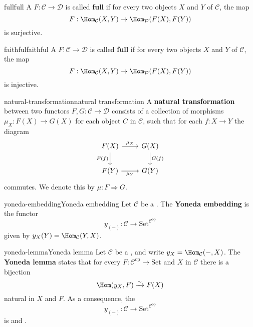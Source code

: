 \begin{topic}{full}{full}
    A  $F : \mathcal{C} \to \mathcal{D}$ is called \textbf{full} if for every two objects $X$ and $Y$ of $\mathcal{C}$, the map
    \[ F : \Hom_{\mathcal{C}}(X, Y) \to \Hom_{\mathcal{D}}(F(X), F(Y)) \]
    is surjective.
\end{topic}

\begin{topic}{faithful}{faithful}
    A  $F : \mathcal{C} \to \mathcal{D}$ is called \textbf{full} if for every two objects $X$ and $Y$ of $\mathcal{C}$, the map
    \[ F : \Hom_{\mathcal{C}}(X, Y) \to \Hom_{\mathcal{D}}(F(X), F(Y)) \]
    is injective.
\end{topic}

\begin{topic}{natural-transformation}{natural transformation}
    A \textbf{natural transformation} between two functors $F, G : \mathcal{C} \to \mathcal{D}$ consists of a collection of morphisms $\mu_X : F(X) \to G(X)$ for each object $C$ in $\mathcal{C}$, such that for each $f : X \to Y$ the diagram
    \[ \begin{tikzcd} F(X) \arrow{r}{\mu_X} \arrow[swap]{d}{F(f)} & G(X) \arrow{d}{G(f)} \\ F(Y) \arrow[swap]{r}{\mu_Y} & G(Y) \end{tikzcd} \]
    commutes. We denote this by $\mu : F \Rightarrow G$.
\end{topic}

\begin{topic}{yoneda-embedding}{Yoneda embedding}
    Let $\mathcal{C}$ be a . The \textbf{Yoneda embedding} is the functor
    \[ y_{(-)} : \mathcal{C} \to \text{Set}^{\mathcal{C}^\text{op}} \]
    given by $y_X(Y) = \Hom_{\mathcal{C}}(Y, X)$.
\end{topic}

\begin{topic}{yoneda-lemma}{Yoneda lemma}
    Let $\mathcal{C}$ be a , and write $y_X = \Hom_{\mathcal{C}}(-, X)$. The \textbf{Yoneda lemma} states that for every $F : \mathcal{C}^\text{op} \to \text{Set}$ and $X$ in $\mathcal{C}$ there is a bijection
    \[ \Hom(y_X, F) \xrightarrow{\sim} F(X)  \]
    natural in $X$ and $F$. As a consequence, the 
    \[ y_{(-)} : \mathcal{C} \to \text{Set}^{\mathcal{C}^\text{op}} \]
    is  and .
\end{topic}


